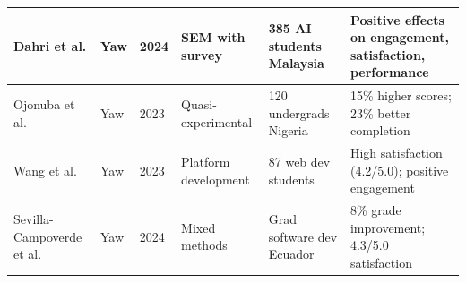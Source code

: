 \documentclass[12pt,a4paper]{article}
\begin{document}
\begin{table}[H]
{\begin{tabular}{|L{2cm}|L{2cm}|C{1cm}|L{3cm}|L{3cm}|L{4cm}|}
Dahri et al. & 
Yaw & 
2024 & 
SEM with survey & 
385 AI students Malaysia & 
Positive effects on engagement, satisfaction, performance
\tabularnewline
\hline

Ojonuba et al. & 
Yaw & 
2023 & 
Quasi-experimental & 
120 undergrads Nigeria & 
15\% higher scores; 23\% better completion
\tabularnewline
\hline

Wang et al. & 
Yaw & 
2023 & 
Platform development & 
87 web dev students & 
High satisfaction (4.2/5.0); positive engagement
\tabularnewline
\hline

Sevilla-Campoverde et al. & 
Yaw & 
2024 & 
Mixed methods & 
Grad software dev Ecuador & 
8\% grade improvement; 4.3/5.0 satisfaction
\tabularnewline
\hline

\end{tabular}%
}

\end{table}

\vspace{0.5cm}
\end{document}
